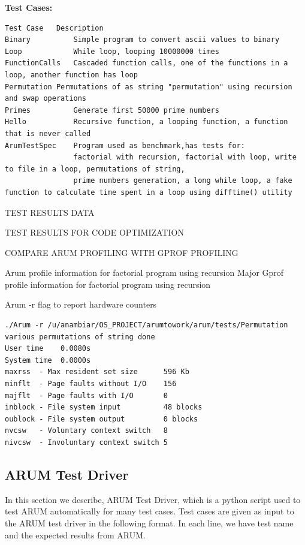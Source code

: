 \documentclass[11pt,letterpaper,oneside]{article}
\begin{document}
{\bf Test Cases:}
\begin{verbatim}
Test Case	Description
Binary	        Simple program to convert ascii values to binary
Loop	        While loop, looping 10000000 times
FunctionCalls	Cascaded function calls, one of the functions in a loop, another function has loop
Permutation	Permutations of as string "permutation" using recursion and swap operations
Primes	        Generate first 50000 prime numbers
Hello	        Recursive function, a looping function, a function that is never called
ArumTestSpec	Program used as benchmark,has tests for: 
                factorial with recursion, factorial with loop, write to file in a loop, permutations of string, 
                prime numbers generation, a long while loop, a fake function to calculate time spent in a loop using difftime() utility
\end{verbatim}

TEST RESULTS DATA

TEST RESULTS FOR CODE OPTIMIZATION

COMPARE ARUM PROFILING WITH GPROF PROFILING

Arum profile information for factorial program using recursion
Major Gprof profile information for factorial program using recursion

Arum -r flag to report hardware counters

\begin{verbatim}
./Arum -r /u/anambiar/OS_PROJECT/arumtowork/arum/tests/Permutation
various permutations of string done
User time    0.0080s
System time  0.0000s
maxrss  - Max resident set size      596 Kb
minflt  - Page faults without I/O    156
majflt  - Page faults with I/O       0
inblock - File system input          48 blocks
oublock - File system output         0 blocks
nvcsw   - Voluntary context switch   8
nivcsw  - Involuntary context switch 5

\end{verbatim}

\subsection{ARUM Test Driver}

In this section we describe, ARUM Test Driver, which is a python script used to test ARUM automatically for many test cases. Test cases are given as input to the ARUM test driver in the following format. In each line, we have test name and the expected results from ARUM.\newline
\end{document}
